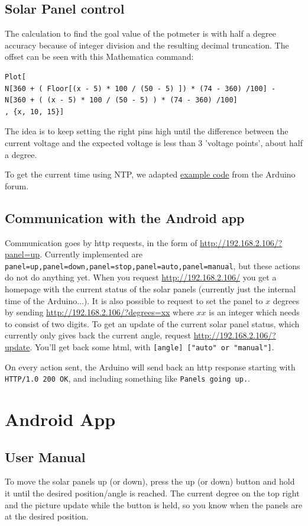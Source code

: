 \documentclass{article}
\begin{document}
		\subsection{Solar Panel control}
			The calculation to find the goal value of the potmeter is with half a degree accuracy because of integer division and the resulting decimal truncation. The offset can be seen with this Mathematica command:
			\begin{lstlisting}
Plot[
N[360 + ( Floor[(x - 5) * 100 / (50 - 5) ]) * (74 - 360) /100] - 
N[360 + ( (x - 5) * 100 / (50 - 5) ) * (74 - 360) /100]
, {x, 10, 15}]
			\end{lstlisting}
			The idea is to keep setting the right pins high until the difference between the current voltage and the expected voltage is less than 3 'voltage points', about half a degree.
			
			To get the current time using NTP, we adapted \href{http://forum.arduino.cc/index.php?topic=171941.0}{example code} from the Arduino forum.
			
		\subsection{Communication with the Android app} \label{arduinoToAndroid}
			Communication goes by http requests, in the form of \url{http://192.168.2.106/?panel=up}. Currently implemented are \verb|panel=up,panel=down,panel=stop,panel=auto,panel=manual|, but these actions do not do anything yet. When you request \url{http://192.168.2.106/} you get a homepage with the current status of the solar panels (currently just the internal time of the Arduino...). It is also possible to request to set the panel to $x$ degrees by sending \url{http://192.168.2.106/?degrees=xx} where $xx$ is an integer which needs to consist of two digits. To get an update of the current solar panel status, which currently only gives back the current angle, request \url{http://192.168.2.106/?update}. You'll get back some html, with \verb|[angle] ["auto" or "manual"]|.
			
			On every action sent, the Arduino will send back an http response starting with \verb|HTTP/1.0 200 OK|, and including something like \verb|Panels going up.|.
			
	\section{Android App}
		\subsection{User Manual}
			To move the solar panels up (or down), press the up (or down) button and hold it until the desired position/angle is reached. The current degree on the top right and the picture update while the button is held, so you know when the panels are at the desired position.
			
\end{document}
